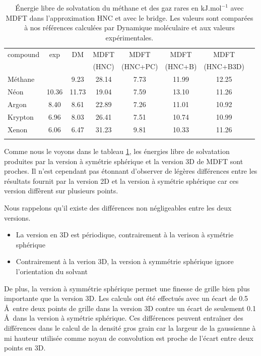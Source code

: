 \begin{table}[h]
  \centering
  \begin{tabular}{ l c c c c c c c }
    \hline & \\[-1em]\hline
    compound   & exp  & DM & MDFT & MDFT & MDFT  & MDFT \\
               &      &    & (HNC)  & (HNC+PC)  & (HNC+B) & (HNC+B3D) \\
    \hline
    Méthane    &       &  9.23 & 28.14 & 7.73 & 11.99 & 12.25 \\
    Néon       & 10.36 & 11.73 & 19.04 & 7.59 & 13.10 & 11.26 \\
    Argon      &  8.40 &  8.61 & 22.89 & 7.26 & 11.01 & 10.92 \\
    Krypton    &  6.96 &  8.03 & 26.41 & 7.51 & 10.74 & 10.99 \\
    Xenon      &  6.06 &  6.47 & 31.23 & 9.81 & 10.33 & 11.26 \\
    \hline & \\[-1em]\hline
  \end{tabular}
  \caption[\'Energie libre de solvatation du méthane et des gaz rares.]{\'Energie libre de solvatation du méthane et des gaz rares en $\mathrm{kJ}.\mathrm{mol}^{-1}$ avec MDFT dans l'approximation HNC et avec le bridge. Les valeurs sont comparées à nos références calculées par Dynamique moléculaire et aux valeurs expérimentales\cite{straatsma_free_1986}.}
  \label{tab:deltag_1D_3D}  
\end{table}

Comme nous le voyons dans le tableau \ref{tab:deltag_1D_3D}, les énergies libre de solvatation produites par la version à symétrie sphérique et la version 3D de MDFT sont proches. Il n'est cependant pas étonnant d'observer de légères différences entre les résultats fournit par la version 2D et la version à symétrie sphérique car ces version diffèrent sur plusieurs points. 

Nous rappelons qu'il existe des différences non négligeables entre les deux versions.

\begin{itemize}
\item La version en 3D est périodique, contrairement à la verison à symétrie sphérique
\item Contrairement à la verion 3D, la version à symmétrie sphérique ignore l'orientation du solvant
\end{itemize}

De plus, la version à symmétrie sphérique permet une finesse de grille bien plus importante que la version 3D. Les calculs ont été effectués avec un écart de 0.5 \AA\ entre deux points de grille dans la version 3D contre un écart de seulement 0.1 \AA\ dans la version à symétrie sphérique. Ces différences peuvent entraîner des différences dans le calcul de la densité gros grain car la largeur de la gaussienne à mi hauteur utilisée comme noyau de convolution est proche de l'écart entre deux points en 3D.

